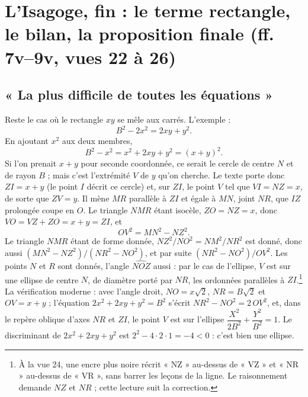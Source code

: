 \documentclass[11pt,a4paper]{article}
\begin{document}
\section*{L'Isagoge, fin : le terme rectangle, le bilan, la proposition finale (ff. 7v–9v, vues 22 à 26)}

\subsection*{« La plus difficile de toutes les équations »}

Reste le cas où le rectangle $xy$ se mêle aux carrés. L'exemple :
\[ B^2 - 2x^2 = 2xy + y^2 . \]
En ajoutant $x^2$ aux deux membres,
\[ B^2 - x^2 = x^2 + 2xy + y^2 = (x + y)^2 . \]
Si l'on prenait $x + y$ pour seconde coordonnée, ce serait le cercle de centre
$N$ et de rayon $B$ ; mais c'est l'extrémité $V$ de $y$ qu'on cherche. Le texte
porte donc $ZI = x + y$ (le point $I$ décrit ce cercle) et, sur $ZI$, le point
$V$ tel que $VI = NZ = x$, de sorte que $ZV = y$. Il mène $MR$ parallèle à $ZI$
et égale à $MN$, joint $NR$, que $IZ$ prolongée coupe en $O$. Le triangle $NMR$
étant isocèle, $ZO = NZ = x$, donc $VO = VZ + ZO = x + y = ZI$, et
\[ OV^2 = MN^2 - NZ^2 . \]
Le triangle $NMR$ étant de forme donnée, $NZ^2/NO^2 = NM^2/NR^2$ est donné, donc
aussi $(MN^2 - NZ^2)/(NR^2 - NO^2)$, et par suite $(NR^2 - NO^2)/OV^2$. Les
points $N$ et $R$ sont donnés, l'angle $\widehat{NOZ}$ aussi : par le cas de
l'ellipse, $V$ est sur une ellipse de centre $N$, de diamètre porté par $NR$,
les ordonnées parallèles à $ZI$.\footnote{À la vue 24, une encre plus noire
récrit « NZ » au-dessus de « VZ » et « NR » au-dessus de « VR », sans barrer les
leçons de la ligne. Le raisonnement demande $NZ$ et $NR$ ; cette lecture suit
la correction.} La vérification moderne : avec l'angle droit, $NO = x\sqrt2$,
$NR = B\sqrt2$ et $OV = x + y$ ; l'équation $2x^2 + 2xy + y^2 = B^2$ s'écrit
$NR^2 - NO^2 = 2\,OV^2$, et, dans le repère oblique d'axes $NR$ et $ZI$, le
point $V$ est sur l'ellipse $\dfrac{X^2}{2B^2} + \dfrac{Y^2}{B^2} = 1$. Le
discriminant de $2x^2 + 2xy + y^2$ est $2^2 - 4\cdot2\cdot1 = -4 < 0$ : c'est
bien une ellipse.
\end{document}
